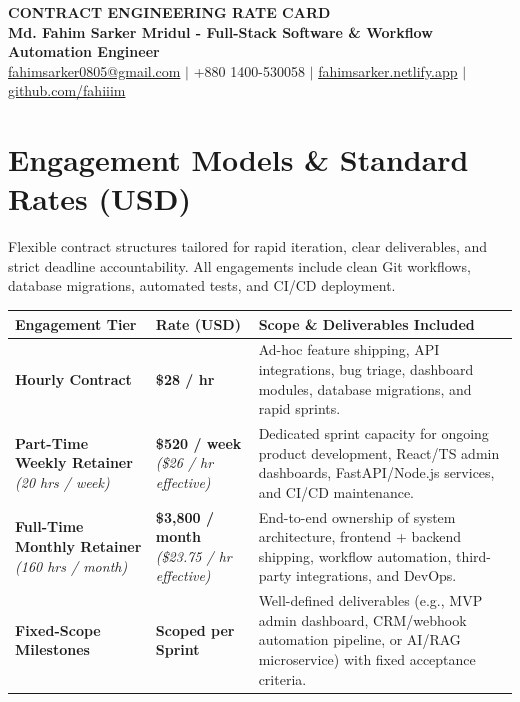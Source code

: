 \documentclass[10.5pt,a4paper]{article}
\begin{document}
{\centering
    {\Large \textbf{CONTRACT ENGINEERING RATE CARD}}\\[4pt]
    \textbf{Md. Fahim Sarker Mridul - Full-Stack Software \& Workflow Automation Engineer}\\[3pt]
    \href{mailto:fahimsarker0805@gmail.com}{fahimsarker0805@gmail.com} \;$\vert$\; +880 1400-530058 \;$\vert$\; \href{https://fahimsarker.netlify.app}{fahimsarker.netlify.app} \;$\vert$\; \href{https://github.com/fahiiim}{github.com/fahiiim}\par
}

\vspace{6pt}
\section*{Engagement Models \& Standard Rates (USD)}
Flexible contract structures tailored for rapid iteration, clear deliverables, and strict deadline accountability. All engagements include clean Git workflows, database migrations, automated tests, and CI/CD deployment.

\vspace{6pt}
\begin{center}
\begin{tabular}{@{} p{4.2cm} p{3.2cm} p{8.2cm} @{}}
\toprule
\textbf{Engagement Tier} & \textbf{Rate (USD)} & \textbf{Scope \& Deliverables Included} \\
\midrule
\textbf{Hourly Contract} & \textbf{\$28 / hr} & Ad-hoc feature shipping, API integrations, bug triage, dashboard modules, database migrations, and rapid sprints. \\
\addlinespace[6pt]
\textbf{Part-Time Weekly Retainer} \newline \textit{(20 hrs / week)} & \textbf{\$520 / week} \newline \textit{(\$26 / hr effective)} & Dedicated sprint capacity for ongoing product development, React/TS admin dashboards, FastAPI/Node.js services, and CI/CD maintenance. \\
\addlinespace[6pt]
\textbf{Full-Time Monthly Retainer} \newline \textit{(160 hrs / month)} & \textbf{\$3,800 / month} \newline \textit{(\$23.75 / hr effective)} & End-to-end ownership of system architecture, frontend + backend shipping, workflow automation, third-party integrations, and DevOps. \\
\addlinespace[6pt]
\textbf{Fixed-Scope Milestones} & \textbf{Scoped per Sprint} & Well-defined deliverables (e.g., MVP admin dashboard, CRM/webhook automation pipeline, or AI/RAG microservice) with fixed acceptance criteria. \\
\bottomrule
\end{tabular}
\end{center}
\end{document}
